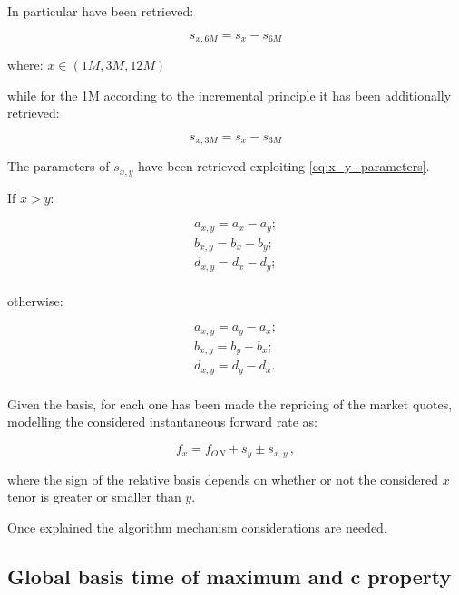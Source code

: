 In particular have been retrieved:

\begin{equation}
  s_{x,6M}=s_{x}-s_{6M}
\end{equation}

where: $x\in{(1M, 3M, 12M)}$ 

while for the 1M according to the incremental principle it has been additionally retrieved:

\begin{equation}
  s_{x,3M}=s_{x}-s_{3M}
\end{equation}

The parameters of $s_{x,y}$ have been retrieved exploiting \eqref{eq:x_y_parameters}.

If $x>y$:

\begin{equation*}
\begin{split}
a_{x,y}= a_{x} - a_{y};\\
b_{x,y}= b_{x} - b_{y} ;\\
d_{x,y}= d_{x} - d_{y} ;\\
\end{split}
\end{equation*}

otherwise:

\begin{equation*}
\begin{split}
a_{x,y}= a_{y} - a_{x};\\
b_{x,y}= b_{y} - b_{x} ;\\
d_{x,y}= d_{y} - d_{x} .\\
\end{split}
\end{equation*}

Given the basis, for each one has been made the repricing of the market quotes, modelling the considered instantaneous forward rate as:

\begin{equation}
  f_{x}=f_{ON} + s_{y} \pm s_{x,y}\,,
\end{equation}

where the sign of the relative basis depends on whether or not the considered $x$ tenor is greater or smaller than $y$.

Once explained the algorithm mechanism considerations are needed.

\subsection{Global basis time of maximum and c property}

